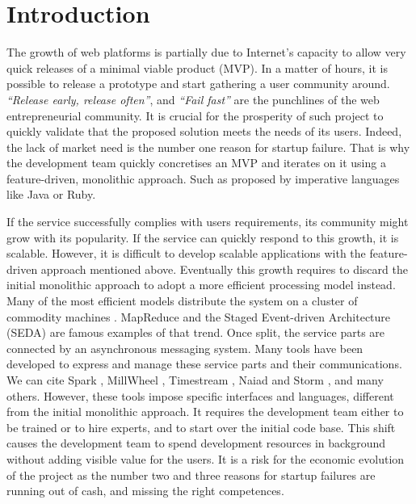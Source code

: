 \section{Introduction}

The growth of web platforms is partially due to Internet's capacity to allow very quick releases of a minimal viable product (MVP).
In a matter of hours, it is possible to release a prototype and start gathering a user community around.
\textit{``Release early, release often''}, and \textit{``Fail fast''} are the punchlines of the web entrepreneurial community.
It is crucial for the prosperity of such project to quickly validate that the proposed solution meets the needs of its users.
Indeed, the lack of market need is the number one reason for startup failure.
That is why the development team quickly concretises an MVP and iterates on it using a feature-driven, monolithic approach.
Such as proposed by imperative languages like Java or Ruby.

If the service successfully complies with users requirements, its community might grow with its popularity.
If the service can quickly respond to this growth, it is scalable.
However, it is difficult to develop scalable applications with the feature-driven approach mentioned above.
Eventually this growth requires to discard the initial monolithic approach to adopt a more efficient processing model instead.
Many of the most efficient models distribute the system on a cluster of commodity machines \cite{Fox1997}.
MapReduce \cite{Dean2008} and the Staged Event-driven Architecture (SEDA) \cite{Welsh2000} are famous examples of that trend. %
Once split, the service parts are connected by an asynchronous messaging system.
Many tools have been developed to express and manage these service parts and their communications.
We can cite Spark \cite{Zaharia2010}, MillWheel \cite{Akidau2013}, Timestream \cite{Qian2013}, Naiad \cite{McSherry} and Storm \cite{Toshniwal2014}, and many others.
However, these tools impose specific interfaces and languages, different from the initial monolithic approach.
It requires the development team either to be trained or to hire experts, and to start over the initial code base.
This shift causes the development team to spend development resources in background without adding visible value for the users.
It is a risk for the economic evolution of the project as the number two and three reasons for startup failures are running out of cash, and missing the right competences.

